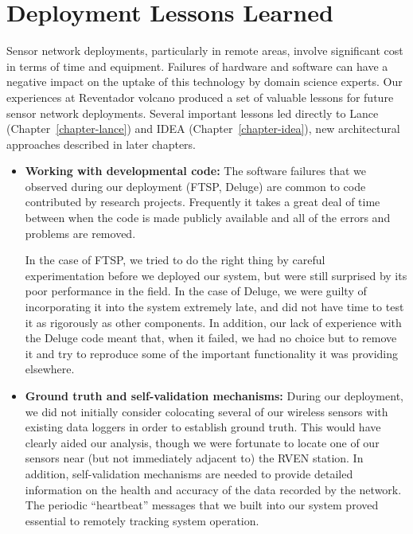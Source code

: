 \section{Deployment Lessons Learned}
\label{evaluation-sec-lessons}

Sensor network deployments, particularly in remote areas, involve significant
cost in terms of time and equipment. Failures of hardware and software can
have a negative impact on the uptake of this technology by domain science
experts. Our experiences at Reventador volcano produced a set of valuable
lessons for future sensor network deployments. Several important lessons led
directly to Lance (Chapter~\ref{chapter-lance}) and IDEA
(Chapter~\ref{chapter-idea}), new architectural approaches described in later
chapters.

\begin{itemize}

\item \textbf{Working with developmental code:} The software failures that we
observed during our deployment (FTSP, Deluge) are common to code contributed
by research projects. Frequently it takes a great deal of time between when
the code is made publicly available and all of the errors and problems are
removed.

\hspace{0.25in} In the case of FTSP, we tried to do the right thing by
careful experimentation before we deployed our system, but were still
surprised by its poor performance in the field. In the case of Deluge, we
were guilty of incorporating it into the system extremely late, and did not
have time to test it as rigorously as other components. In addition, our lack
of experience with the Deluge code meant that, when it failed, we had no
choice but to remove it and try to reproduce some of the important
functionality it was providing elsewhere.

\item \textbf{Ground truth and self-validation mechanisms:}
During our deployment, we did not initially consider colocating several
of our wireless sensors with existing data loggers in order to establish
ground truth. This would have clearly aided our analysis, though we were
fortunate to locate one of our sensors near (but not immediately adjacent to)
the RVEN station. In addition, self-validation mechanisms are needed to
provide detailed information on the health and accuracy of the data recorded
by the network. The periodic ``heartbeat'' messages that we built into our
system proved essential to remotely tracking system operation.


\end{itemize}
